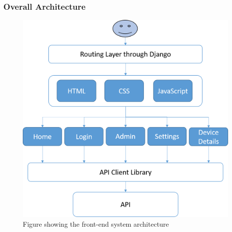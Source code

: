 \documentclass[10pt,twocolumn]{witseiepaper}
\begin{document}
	\subsubsection{Overall Architecture}
	\begin{figure}[!htb]
		\centering
		\label{system_architecture}
		\includegraphics[width=0.9\linewidth]{System_Architecture}
		\caption{Figure showing the front-end system architecture}
	\end{figure}
	
\end{document}
